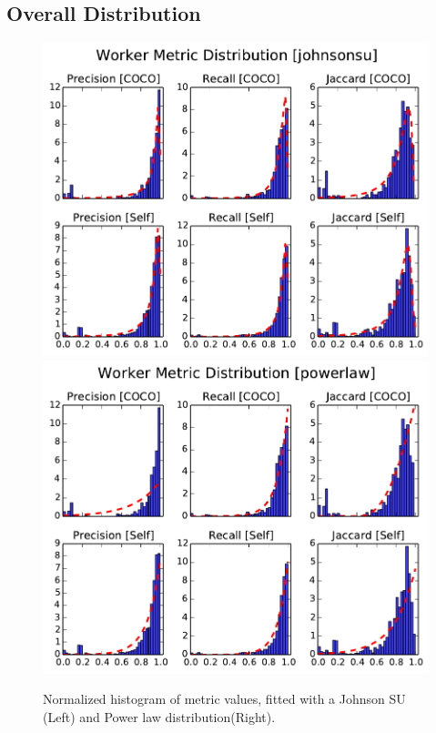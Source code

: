 \documentclass[12pt]{article}
\begin{document}
\subsection{Overall Distribution}
\begin{figure}[ht]
\centering
\includegraphics[width=0.45\linewidth]{johnsonsu_fitted_metric_histogram.pdf}
\includegraphics[width=0.45\linewidth]{powerlaw_fitted_metric_histogram.pdf}
\caption{Normalized histogram of metric values, fitted with a Johnson SU (Left) and Power law distribution(Right). }
\label{metric_hist}
\end{figure}
\end{document}
